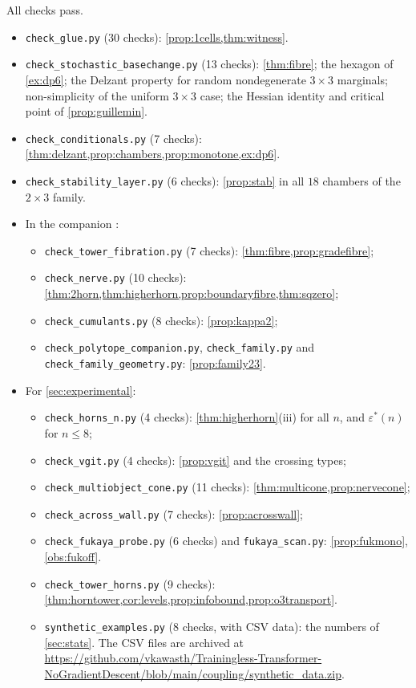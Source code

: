\documentclass[11pt]{article}
\theoremstyle{definition}
\theoremstyle{remark}
\begin{document}
All checks pass.
\begin{itemize}[leftmargin=*]
\item \texttt{check\_glue.py} (30 checks): \cref{prop:1cells,thm:witness}.
\item \texttt{check\_stochastic\_basechange.py} (13 checks): \cref{thm:fibre}; the hexagon of \cref{ex:dp6}; the Delzant
  property for random nondegenerate $3\times3$ marginals; non-simplicity of the uniform $3\times3$ case; the Hessian
  identity and critical point of \cref{prop:guillemin}.
\item \texttt{check\_conditionals.py} (7 checks): \cref{thm:delzant,prop:chambers,prop:monotone,ex:dp6}.
\item \texttt{check\_stability\_layer.py} (6 checks): \cref{prop:stab} in all $18$ chambers of the $2\times3$ family.
\item In the companion \cite{Awasthi-Family}:
  \begin{itemize}[leftmargin=*]
  \item \texttt{check\_tower\_fibration.py} (7 checks): \cref{thm:fibre,prop:gradefibre};
  \item \texttt{check\_nerve.py} (10 checks): \cref{thm:2horn,thm:higherhorn,prop:boundaryfibre,thm:sqzero};
  \item \texttt{check\_cumulants.py} (8 checks): \cref{prop:kappa2};
  \item \texttt{check\_polytope\_companion.py}, \texttt{check\_family.py} and \texttt{check\_family\_geometry.py}:
    \cref{prop:family23}.
  \end{itemize}
\item For \cref{sec:experimental}:
  \begin{itemize}[leftmargin=*]
  \item \texttt{check\_horns\_n.py} (4 checks): \cref{thm:higherhorn}(iii) for all $n$, and $\varepsilon^*(n)$ for $n\le8$;
  \item \texttt{check\_vgit.py} (4 checks): \cref{prop:vgit} and the crossing types;
  \item \texttt{check\_multiobject\_cone.py} (11 checks): \cref{thm:multicone,prop:nervecone};
  \item \texttt{check\_across\_wall.py} (7 checks): \cref{prop:acrosswall};
  \item \texttt{check\_fukaya\_probe.py} (6 checks) and \texttt{fukaya\_scan.py}: \cref{prop:fukmono}, \cref{obs:fukoff}.
  \item \texttt{check\_tower\_horns.py} (9 checks): \cref{thm:horntower,cor:levels,prop:infobound,prop:o3transport}.
  \item \texttt{synthetic\_examples.py} (8 checks, with CSV data): the numbers of \cref{sec:stats}. The CSV files are archived at \url{https://github.com/vkawasth/Trainingless-Transformer-NoGradientDescent/blob/main/coupling/synthetic_data.zip}.
  \end{itemize}
\end{itemize}
\end{document}
